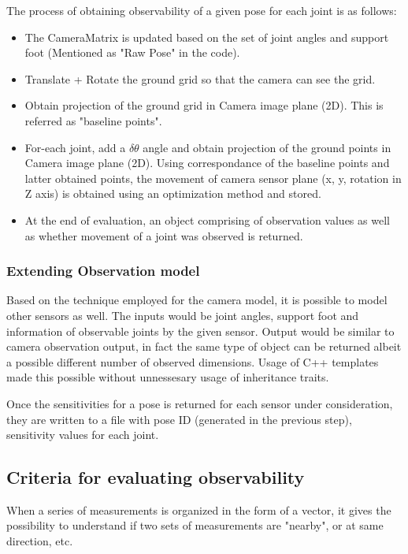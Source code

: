 \documentclass[english, printversion, nomenclature]{tuvisionthesis} %
\begin{document}
The process of obtaining observability of a given pose for each joint is as follows: 
\begin{itemize}
	\item The CameraMatrix is updated based on the set of joint angles and support foot (Mentioned as "Raw Pose" in the code).
	\item Translate + Rotate the ground grid so that the camera can see the grid.
	\item Obtain projection of the ground grid in Camera image plane (2D). This is referred as "baseline points".
	\item For-each joint, add a \(\delta\theta\) angle and obtain projection of the ground points in Camera image plane (2D).
	\subitem Using correspondance of the baseline points and latter obtained points, the movement of camera sensor plane (x, y, rotation in Z axis) is obtained using an optimization method and stored.
	\item At the end of evaluation, an object comprising of observation values as well as whether movement of a joint was observed is returned.
\end{itemize}


\subsubsection{Extending Observation model}

Based on the technique employed for the camera model, it is possible to model other sensors as well. The inputs would be joint angles, support foot and information of observable joints by the given sensor.
Output would be similar to camera observation output, in fact the same type of object can be returned albeit a possible different number of observed dimensions. Usage of C++ templates made this possible without unnessesary usage of inheritance traits. 

Once the sensitivities for a pose is returned for each sensor under consideration, they are written to a file with pose ID (generated in the previous step), sensitivity values for each joint. 
\subsection{Criteria for evaluating observability}

When a series of measurements is organized in the form of a vector, it gives the possibility to understand if two sets of measurements are "nearby", or at same direction, etc. 
\end{document}
